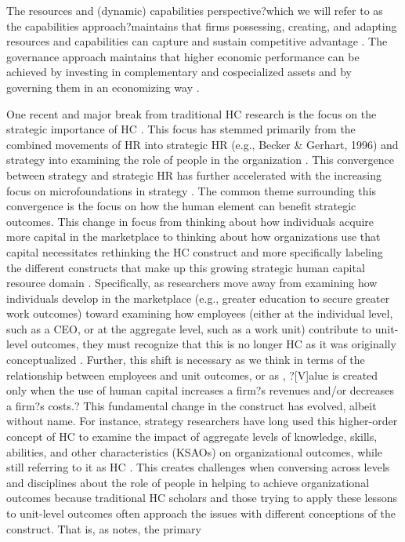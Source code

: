 \documentclass[12pt,letterpaper]{article}
\begin{document}
The resources and (dynamic) capabilities perspective?which we will refer to as the capabilities approach?maintains that firms possessing, creating, and adapting resources and capabilities can capture and sustain competitive advantage \citep{Barney1991, 
Penrose1959, Teece1997}. The governance approach maintains that higher economic performance can be achieved by investing in complementary and cospecialized assets \citep{Helfat1997, Teece1986} and by governing them in an economizing way \citep{Oxley1997, Williamson1985}.

One recent and major break from traditional HC research is the focus on the strategic importance of HC \citep{Wright2014}. This focus has stemmed primarily from the combined movements of HR into strategic HR (e.g., Becker \& Gerhart, 1996)
and strategy into examining the role of people in the organization \citep{Hitt2001b}. This convergence between strategy and strategic HR has further accelerated with the increasing focus on microfoundations in strategy \citep{Nyberg2014}. The common theme surrounding this convergence is the focus on how the human element can benefit strategic outcomes.
This change in focus from thinking about how individuals acquire more capital in the marketplace to thinking about how organizations use that capital necessitates rethinking the HC construct and more specifically labeling the different constructs that make up this growing strategic human capital resource domain \citep{Wright2014}. Specifically, as researchers move away from examining how individuals
develop in the marketplace (e.g., greater education to secure greater work outcomes) toward examining how employees (either at the individual level, such as a CEO, or at the aggregate level, such as a work unit) contribute to unit-level outcomes, they must recognize that this is no longer HC as it was originally conceptualized \citep{Ployhart2014}. Further, this shift is necessary as we think in
terms of the relationship between employees and unit outcomes, or as \cite{Molloy2015}, ?[V]alue is created only when the use of human capital increases a firm?s revenues and/or decreases a firm?s costs.? This fundamental change in the construct has evolved, albeit without name. For instance, strategy researchers have long used this higher-order concept of HC to examine the impact of aggregate levels of knowledge, skills, abilities, and other characteristics (KSAOs) on organizational outcomes, while
still referring to it as HC \citep{Nyberg2014}. This creates challenges when conversing across levels and disciplines about the role of people in helping to achieve organizational outcomes because traditional HC scholars and those trying to apply these lessons to unit-level outcomes often approach the issues with different conceptions of the construct. That is, as \cite{Ployhart2015} notes, the primary
\end{document}
